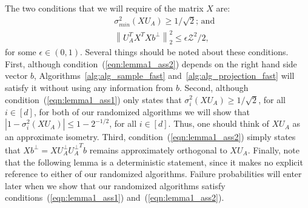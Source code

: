 \documentclass[11pt]{article}
\newcommand{\VTTNormS}[1]{\mbox{}\left\|#1\right\|_2^2}
\newcommand{\abs }[1]{\left|#1\right|}
\begin{document}
The two conditions that we will require of the matrix $X$ are:
\begin{eqnarray}
\label{eqn:lemma1_ass1}
& & \sigma_{min}^2 \left( XU_A \right) \ge 1/\sqrt{2} \mbox{; and}  \\
\label{eqn:lemma1_ass2} & &
\VTTNormS{U_A^TX^TXb^{\perp}}
      \le \epsilon \mathcal{Z}^2/2  ,
\end{eqnarray}
for some $\epsilon \in (0,1)$. Several things should be noted about these conditions. First, although condition~(\ref{eqn:lemma1_ass2}) depends on the right hand side vector $b$, Algorithms~\ref{alg:alg_sample_fast} and~\ref{alg:alg_projection_fast} will satisfy it without using any information from $b$. Second, although condition~(\ref{eqn:lemma1_ass1}) only states that $\sigma_i^2(XU_A)\geq 1/\sqrt{2}$, for all $i \in [d]$, for both of our randomized algorithms we will show that $\abs{1-\sigma_i^2(XU_A)} \le 1-2^{-1/2}$, for all $i \in [d]$. Thus, one should think of $XU_A$ as an approximate isometry. Third, condition~(\ref{eqn:lemma1_ass2}) simply states that $Xb^{\perp}=XU_A^{\perp}{U_A^{\perp}}^{T}b$ remains approximately orthogonal to $XU_A$. Finally, note that the following lemma is a deterministic statement, since it makes no explicit reference to either of our randomized algorithms. Failure probabilities will enter later when we show that our randomized algorithms satisfy conditions~(\ref{eqn:lemma1_ass1}) and~(\ref{eqn:lemma1_ass2}).
\end{document}
